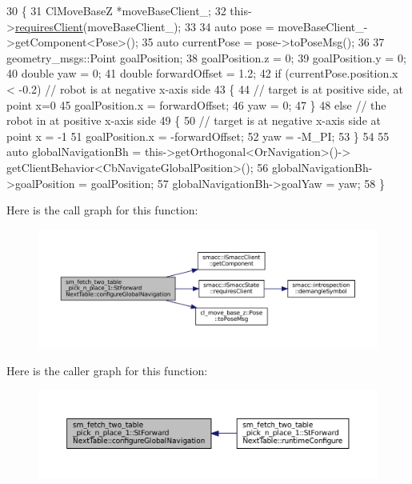 \begin{DoxyCode}
30   \{
31     ClMoveBaseZ *moveBaseClient\_;
32     this->\hyperlink{classsmacc_1_1ISmaccState_a7f95c9f0a6ea2d6f18d1aec0519de4ac}{requiresClient}(moveBaseClient\_);
33 
34     \textcolor{keyword}{auto} pose = moveBaseClient\_->getComponent<Pose>();
35     \textcolor{keyword}{auto} currentPose = pose->toPoseMsg();
36 
37     geometry\_msgs::Point goalPosition;
38     goalPosition.z = 0;
39     goalPosition.y = 0;
40     \textcolor{keywordtype}{double} yaw = 0;
41     \textcolor{keywordtype}{double} forwardOffset = 1.2;
42     \textcolor{keywordflow}{if} (currentPose.position.x < -0.2)  \textcolor{comment}{// robot is at negative x-axis side}
43     \{
44       \textcolor{comment}{// target is at positive side, at point x=0}
45       goalPosition.x = forwardOffset;
46       yaw = 0;
47     \}
48     \textcolor{keywordflow}{else}  \textcolor{comment}{// the robot in at positive x-axis side}
49     \{
50       \textcolor{comment}{// target is at negative x-axis side at point x = -1}
51       goalPosition.x = -forwardOffset;
52       yaw = -M\_PI;
53     \}
54 
55     \textcolor{keyword}{auto} globalNavigationBh = this->getOrthogonal<OrNavigation>()->
      getClientBehavior<CbNavigateGlobalPosition>();
56     globalNavigationBh->goalPosition = goalPosition;
57     globalNavigationBh->goalYaw = yaw;
58   \}
\end{DoxyCode}
Here is the call graph for this function\+:
\nopagebreak
\begin{figure}[H]
\begin{center}
\leavevmode
\includegraphics[width=350pt]{structsm__fetch__two__table__pick__n__place__1_1_1StForwardNextTable_a7b7d04ab57af4686b394afda86c891af_cgraph}
\end{center}
\end{figure}
Here is the caller graph for this function\+:
\nopagebreak
\begin{figure}[H]
\begin{center}
\leavevmode
\includegraphics[width=350pt]{structsm__fetch__two__table__pick__n__place__1_1_1StForwardNextTable_a7b7d04ab57af4686b394afda86c891af_icgraph}
\end{center}
\end{figure}
